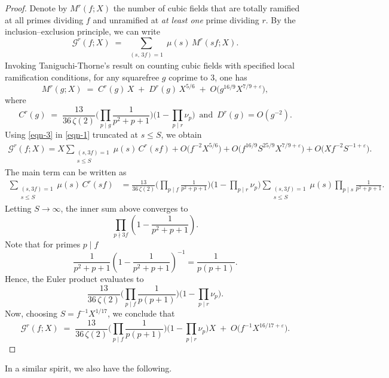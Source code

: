 \documentclass[11pt,reqno]{amsart}
\newcommand{\cG}{\mathcal{G}}
\theoremstyle{definition}
\theoremstyle{remark}
\begin{document}
\begin{proof}
Denote by $M^r(f; X)$  the number of cubic fields that are totally ramified at all primes dividing $f$ and unramified at \emph{at least one} prime dividing $r$. By the inclusion–exclusion principle, we can write
\begin{equation}\label{eqn-1}
\cG^r(f; X) \;=\; \sum_{\substack{(s,\,3f)=1}} \mu(s)\, M^r(sf; X).
\end{equation}
Invoking Taniguchi-Thorne's result \cite{countingcubicfields} on counting cubic fields with specified local ramification conditions, for any squarefree $g$ coprime to $3$, one has
	\begin{equation}\label{eqn-3}
	M^r(g;X)
	\;=\; C^r(g)\,X \;+\; D^r(g)\,X^{5/6} 
	\;+\; O\!\big(g^{16/9} X^{7/9+\varepsilon}\big),
	\end{equation}
	where
	\[
	C^r(g) \;=\; \frac{13}{36\,\zeta(2)}
	\Bigg(\prod_{p\mid g} \frac{1}{p^2+p+1}\Bigg)
	\Bigg(1 - \prod_{p\mid r}\nu_p\Bigg) 
	\,\,\,\text{and}\,\,\, D^r(g)=O(g^{-2}).
	\]
Using \eqref{eqn-3} in \eqref{eqn-1} truncated at $s\leq S$, we obtain
\begin{align*}
    	\cG^{r}(f; X)
	= X \sum_{\substack{(s,3f)=1 \\ s\le S}} \mu(s)\,C^r(sf)
	+ O\!\big(f^{-2}X^{5/6}\big)
	+ O\!\big(f^{16/9}S^{25/9}X^{7/9+\varepsilon}\big)
	+ O\!\big(X f^{-2}S^{-1+\varepsilon}\big).	
\end{align*}
The main term can be written as
	\begin{align*}
		\sum_{\substack{(s,3f)=1 \\ s\le S}} \mu(s)\,C^r(sf)
		&= \frac{13}{36\,\zeta(2)}\Bigg(\prod_{p\mid f}\frac{1}{p^2+p+1}\Bigg)\Bigg(1-\prod_{p\mid r}\nu_p\Bigg)
		\sum_{\substack{(s,3f)=1 \\ s\le S}} \mu(s)\prod_{p\mid s}\frac{1}{p^2+p+1}.
	\end{align*}
Letting $S\to\infty$, the inner sum above converges to
	\[
	\prod_{p\nmid 3f}\left(1-\frac{1}{p^2+p+1}\right).
	\]
Note that for primes $p\mid f$
	\[
	\frac{1}{p^2+p+1}\left(1-\frac{1}{p^2+p+1}\right)^{-1}
	= \frac{1}{p(p+1)}.
	\]
Hence, the Euler product evaluates to
	\[
	\frac{13}{36\,\zeta(2)}\Bigg(\prod_{p\mid f}\frac{1}{p(p+1)}\Bigg)\Bigg(1-\prod_{p\mid r}\nu_p\Bigg).
	\]
Now, choosing $S=f^{-1}X^{1/17}$, we conclude that
	\[
	\cG^{r}(f; X) \;=\; \frac{13}{36\,\zeta(2)} 
	\Bigg(\prod_{p\mid f} \frac{1}{p(p+1)}\Bigg)
	\Bigg(1 - \prod_{p\mid r} \nu_p\Bigg) X
	\;+\; O\!\big(f^{-1}X^{16/17+\varepsilon}\big).
	\]
\end{proof}
In a similar spirit, we also have the following.
\end{document}
